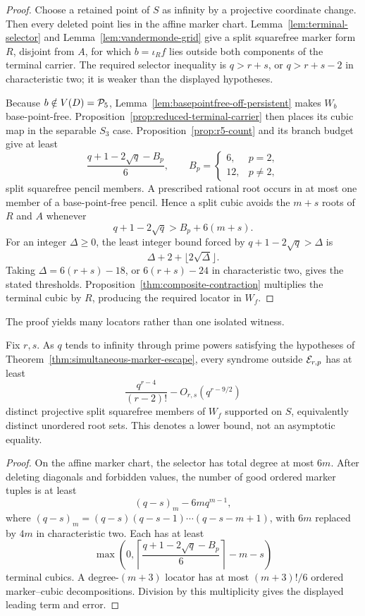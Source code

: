 \begin{proof}
Choose a retained point of \(S\) as infinity by a projective coordinate
change.  Then every deleted point lies in the affine marker chart.
Lemma~\ref{lem:terminal-selector} and
Lemma~\ref{lem:vandermonde-grid} give a split squarefree marker form \(R\),
disjoint from \(A\), for which \(b=\iota_Rf\) lies outside both components of
the terminal carrier.  The required selector inequality is
\(q>r+s\), or \(q>r+s-2\) in characteristic two; it is weaker than the
displayed hypotheses.

Because \(b\notin V(D)=\mathcal P_5\),
Lemma~\ref{lem:basepointfree-off-persistent} makes \(W_b\) base-point-free.
Proposition~\ref{prop:reduced-terminal-carrier} then places its cubic map in
the separable \(S_3\) case.  Proposition~\ref{prop:r5-count} and its branch
budget give at least
\[
 \frac{q+1-2\sqrt q-B_p}{6},\qquad
 B_p=\begin{cases}6,&p=2,\\12,&p\ne2,
 \end{cases}
\]
split squarefree pencil members.  A prescribed rational root occurs in at
most one member of a base-point-free pencil.  Hence a split cubic avoids the
\(m+s\) roots of \(R\) and \(A\) whenever
\[
 q+1-2\sqrt q>B_p+6(m+s).
\]
For an integer \(\Delta\geq0\), the least integer bound forced by
\(q+1-2\sqrt q>\Delta\) is
\[
 \Delta+2+\lfloor2\sqrt\Delta\rfloor.
\]
Taking \(\Delta=6(r+s)-18\), or \(6(r+s)-24\) in characteristic two,
gives the stated thresholds.  Proposition~\ref{thm:composite-contraction}
multiplies the terminal cubic by \(R\), producing the required locator in
\(W_f\).
\end{proof}

The proof yields many locators rather than one isolated witness.

\begin{corollary}
\label{cor:split-witness-abundance}%
%
Fix \(r,s\).  As \(q\) tends to infinity through prime powers satisfying the
hypotheses of
Theorem~\ref{thm:simultaneous-marker-escape}, every syndrome outside
\(\mathcal E_{r,p}\) has at least
\[
 \frac{q^{r-4}}{(r-2)!}-O_{r,s}(q^{r-9/2})
\]
distinct projective split squarefree members of \(W_f\) supported on \(S\),
equivalently distinct unordered root sets.  This denotes a lower bound, not an
asymptotic equality.
\end{corollary}

\begin{proof}
On the affine marker chart, the selector has total degree at most \(6m\).
After deleting diagonals and forbidden values, the number of good ordered
marker tuples is at least
\[
 (q-s)_m-6m q^{m-1},
\]
where \((q-s)_m=(q-s)(q-s-1)\cdots(q-s-m+1)\),
with \(6m\) replaced by \(4m\) in characteristic two.  Each has at least
\[
 \max\!\left(0,
 \left\lceil\frac{q+1-2\sqrt q-B_p}{6}\right\rceil-m-s\right)
\]
terminal cubics.  A degree-\((m+3)\) locator has at most
\((m+3)!/6\) ordered marker--cubic decompositions.  Division by this
multiplicity gives the displayed leading term and error.
\end{proof}

